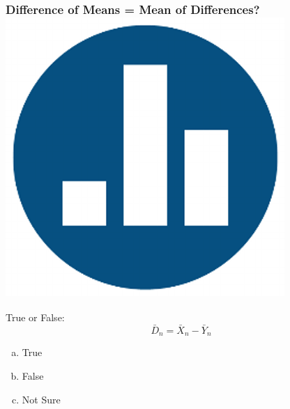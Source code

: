 \begin{frame}
\frametitle{Difference of Means = Mean of Differences?\hfill \includegraphics[scale = 0.05]{./images/clicker}}

True or False:
	$$\bar{D}_n = \bar{X}_n - \bar{Y}_n$$

\begin{enumerate}[(a)]
	\item True
	\item False
	\item Not Sure
\end{enumerate}

\end{frame}
